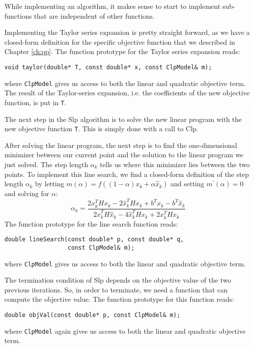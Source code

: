 While implementing an algorithm, it makes sense to start to implement
sub-functions that are independent of other functions.

Implementing the Taylor series expansion is pretty straight forward, as
we have a closed-form definition for the specific objective function that
we described in Chapter \ref{ch:qp}. The function prototype for the
Taylor series expansion reads:
\begin{verbatim}
void taylor(double* T, const double* x, const ClpModel& m);
\end{verbatim}
where \texttt{ClpModel} gives us access to both the linear and quadratic
objective term. The result of the Taylor-series expansion, i.e. the 
coefficients of the new objective function, is put in \texttt{T}.

The next step in the Slp algorithm is to solve the new linear program with the
new objective function \texttt{T}. This is simply done with a call to Clp.

After solving the linear program, the next step is to find the one-dimensional
minimizer between our current point and the solution to the linear program we
just solved.
The step length $\alpha_k$ tells us where this minimizer lies between the two
points.
To implement this line search, we find a closed-form definition of the step
length $\alpha_k$ by letting $m(\alpha) = f((1-\alpha) x_k + \alpha \hat{x}_k)$
and setting $m^\prime(\alpha) = 0$ and solving for $\alpha$:
\[
\alpha_k = \frac{
                2x_k^T H x_k
                - 2\hat{x}_k^T H x_k
                + b^T x_k - b^T \hat{x}_k
                }{
                  2\hat{x}_k^T H \hat{x}_k
                - 4\hat{x}_k^T H x_k
                + 2x_k^T H x_k
                }
\]
The function prototype for the line search function reads:
\begin{verbatim}
double lineSearch(const double* p, const double* q,
                  const ClpModel& m);
\end{verbatim}
where \texttt{ClpModel} gives us access to both the linear and quadratic
objective term.

The termination condition of Slp depends on the objective value of the two
previous iterations. So, in order to terminate, we need a function that can
compute the objective value. The function prototype for this function reads:
\begin{verbatim}
double objVal(const double* p, const ClpModel& m);
\end{verbatim}
where \texttt{ClpModel} again gives us access to both the linear and quadratic
objective term.

